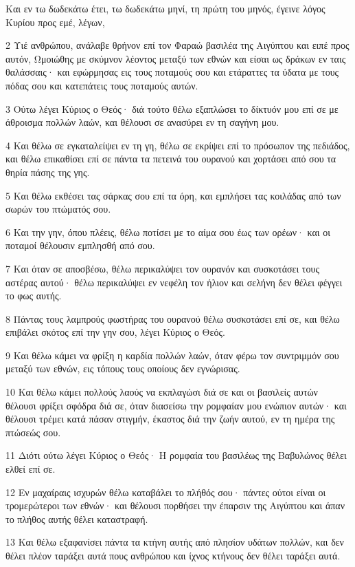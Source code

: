 \par Και εν τω δωδεκάτω έτει, τω δωδεκάτω μηνί, τη πρώτη του μηνός, έγεινε λόγος Κυρίου προς εμέ, λέγων,
\par 2 Υιέ ανθρώπου, ανάλαβε θρήνον επί τον Φαραώ βασιλέα της Αιγύπτου και ειπέ προς αυτόν, Ωμοιώθης με σκύμνον λέοντος μεταξύ των εθνών και είσαι ως δράκων εν ταις θαλάσσαις· και εφώρμησας εις τους ποταμούς σου και ετάραττες τα ύδατα με τους πόδας σου και κατεπάτεις τους ποταμούς αυτών.
\par 3 Ούτω λέγει Κύριος ο Θεός· διά τούτο θέλω εξαπλώσει το δίκτυόν μου επί σε με άθροισμα πολλών λαών, και θέλουσι σε ανασύρει εν τη σαγήνη μου.
\par 4 Και θέλω σε εγκαταλείψει εν τη γη, θέλω σε εκρίψει επί το πρόσωπον της πεδιάδος, και θέλω επικαθίσει επί σε πάντα τα πετεινά του ουρανού και χορτάσει από σου τα θηρία πάσης της γης.
\par 5 Και θέλω εκθέσει τας σάρκας σου επί τα όρη, και εμπλήσει τας κοιλάδας από των σωρών του πτώματός σου.
\par 6 Και την γην, όπου πλέεις, θέλω ποτίσει με το αίμα σου έως των ορέων· και οι ποταμοί θέλουσιν εμπλησθή από σου.
\par 7 Και όταν σε αποσβέσω, θέλω περικαλύψει τον ουρανόν και συσκοτάσει τους αστέρας αυτού· θέλω περικαλύψει εν νεφέλη τον ήλιον και σελήνη δεν θέλει φέγγει το φως αυτής.
\par 8 Πάντας τους λαμπρούς φωστήρας του ουρανού θέλω συσκοτάσει επί σε, και θέλω επιβάλει σκότος επί την γην σου, λέγει Κύριος ο Θεός.
\par 9 Και θέλω κάμει να φρίξη η καρδία πολλών λαών, όταν φέρω τον συντριμμόν σου μεταξύ των εθνών, εις τόπους τους οποίους δεν εγνώρισας.
\par 10 Και θέλω κάμει πολλούς λαούς να εκπλαγώσι διά σε και οι βασιλείς αυτών θέλουσι φρίξει σφόδρα διά σε, όταν διασείσω την ρομφαίαν μου ενώπιον αυτών· και θέλουσι τρέμει κατά πάσαν στιγμήν, έκαστος διά την ζωήν αυτού, εν τη ημέρα της πτώσεώς σου.
\par 11 Διότι ούτω λέγει Κύριος ο Θεός· Η ρομφαία του βασιλέως της Βαβυλώνος θέλει ελθεί επί σε.
\par 12 Εν μαχαίραις ισχυρών θέλω καταβάλει το πλήθός σου· πάντες ούτοι είναι οι τρομερώτεροι των εθνών· και θέλουσι πορθήσει την έπαρσιν της Αιγύπτου και άπαν το πλήθος αυτής θέλει καταστραφή.
\par 13 Και θέλω εξαφανίσει πάντα τα κτήνη αυτής από πλησίον υδάτων πολλών, και δεν θέλει πλέον ταράξει αυτά πους ανθρώπου και ίχνος κτήνους δεν θέλει ταράξει αυτά.
